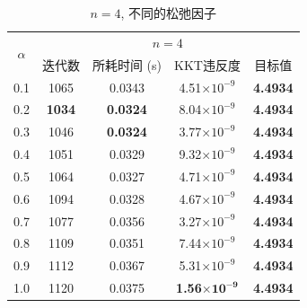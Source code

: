 \documentclass[UTF8,10.5pt,a4paper]{ctexart}
\theoremstyle{definition}
\theoremstyle{definition}
\begin{document}
\begin{table}[htbp]
	\renewcommand{\captionfont}{\small}
    \centering
    \caption{$n=4$, 不同的松弛因子}
    \label{n4alpha}
    \vskip 4mm
    \begin{tabular}{c|c|c|c|c}
        \hline
        \multirow{2}{*}{$\alpha$} & \multicolumn{4}{c}{$n=4$}\\\cline{2-5}
          & 迭代数 & 所耗时间 (s) & KKT违反度 & 目标值\\\hline
        0.1 & 1065 & 0.0343 & 4.51$\times10^{-9}$ & \textbf{4.4934} \\\hline
        0.2 & \textbf{1034} & \textbf{0.0324} & 8.04$\times10^{-9}$ & \textbf{4.4934} \\\hline
        0.3 & 1046 & \textbf{0.0324} & 3.77$\times10^{-9}$ & \textbf{4.4934} \\\hline
        0.4 & 1051 & 0.0329 & 9.32$\times10^{-9}$ & \textbf{4.4934} \\\hline
        0.5 & 1064 & 0.0327 & 4.71$\times10^{-9}$ & \textbf{4.4934} \\\hline
        0.6 & 1094 & 0.0328 & 4.67$\times10^{-9}$ & \textbf{4.4934} \\\hline
        0.7 & 1077 & 0.0356 & 3.27$\times10^{-9}$ & \textbf{4.4934} \\\hline
        0.8 & 1109 & 0.0351 & 7.44$\times10^{-9}$ & \textbf{4.4934} \\\hline
        0.9 & 1112 & 0.0367 & 5.31$\times10^{-9}$ & \textbf{4.4934} \\\hline
        1.0 & 1120 & 0.0375 & \textbf{1.56$\mathbf{\times10^{-9}}$} & \textbf{4.4934} \\\hline
    \end{tabular}
\end{table}
\end{document}
